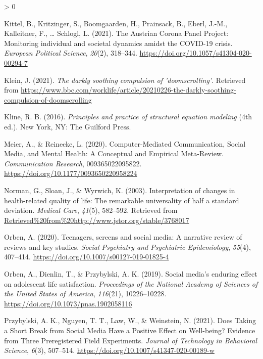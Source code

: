 \documentclass[
  english,
  man,mask,floatsintext]{apa6}
\newlength{\cslhangindent}
\newenvironment{CSLReferences}[2] %
 {%
  \setlength{\parindent}{0pt}
  \ifodd #1 \everypar{\setlength{\hangindent}{\cslhangindent}}\ignorespaces\fi
  \ifnum #2 > 0
  \setlength{\parskip}{#2\baselineskip}
  \fi
 }%
 {}
\begin{document}
\begin{CSLReferences}{1}{0}
\leavevmode\hypertarget{ref-kittelAustrianCoronaPanel2021}{}%
Kittel, B., Kritzinger, S., Boomgaarden, H., Prainsack, B., Eberl, J.-M., Kalleitner, F., \ldots{} Schlogl, L. (2021). The {Austrian} {Corona} {Panel} {Project}: Monitoring individual and societal dynamics amidst the {COVID}-19 crisis. \emph{European Political Science}, \emph{20}(2), 318--344. \url{https://doi.org/10.1057/s41304-020-00294-7}

\leavevmode\hypertarget{ref-kleinDarklySoothingCompulsion2021}{}%
Klein, J. (2021). \emph{The darkly soothing compulsion of 'doomscrolling'}. Retrieved from \url{https://www.bbc.com/worklife/article/20210226-the-darkly-soothing-compulsion-of-doomscrolling}

\leavevmode\hypertarget{ref-klinePrinciplesPracticeStructural2016}{}%
Kline, R. B. (2016). \emph{Principles and practice of structural equation modeling} (4th ed.). New York, NY: The Guilford Press.

\leavevmode\hypertarget{ref-meierComputerMediatedCommunicationSocial2020}{}%
Meier, A., \& Reinecke, L. (2020). Computer-{Mediated} {Communication}, {Social} {Media}, and {Mental} {Health}: {A} {Conceptual} and {Empirical} {Meta}-{Review}. \emph{Communication Research}, 009365022095822. \url{https://doi.org/10.1177/0093650220958224}

\leavevmode\hypertarget{ref-normanInterpretationChangesHealthrelated2003}{}%
Norman, G., Sloan, J., \& Wyrwich, K. (2003). Interpretation of changes in health-related quality of life: {The} remarkable universality of half a standard deviation. \emph{Medical Care}, \emph{41}(5), 582--592. Retrieved from \url{Retrieved\%20from\%20http://www.jstor.org/stable/3768017}

\leavevmode\hypertarget{ref-orbenTeenagersScreensSocial2020}{}%
Orben, A. (2020). Teenagers, screens and social media: A narrative review of reviews and key studies. \emph{Social Psychiatry and Psychiatric Epidemiology}, \emph{55}(4), 407--414. \url{https://doi.org/10.1007/s00127-019-01825-4}

\leavevmode\hypertarget{ref-orbenSocialMediaEnduring2019}{}%
Orben, A., Dienlin, T., \& Przybylski, A. K. (2019). Social media's enduring effect on adolescent life satisfaction. \emph{Proceedings of the National Academy of Sciences of the United States of America}, \emph{116}(21), 10226--10228. \url{https://doi.org/10.1073/pnas.1902058116}

\leavevmode\hypertarget{ref-przybylskiDoesTakingShort2021a}{}%
Przybylski, A. K., Nguyen, T. T., Law, W., \& Weinstein, N. (2021). Does {Taking} a {Short} {Break} from {Social} {Media} {Have} a {Positive} {Effect} on {Well}-being? {Evidence} from {Three} {Preregistered} {Field} {Experiments}. \emph{Journal of Technology in Behavioral Science}, \emph{6}(3), 507--514. \url{https://doi.org/10.1007/s41347-020-00189-w}


\end{CSLReferences}
\end{document}
